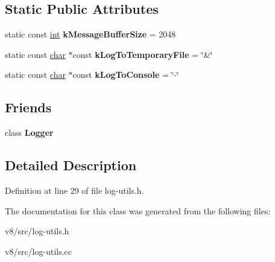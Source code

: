 \subsection*{Static Public Attributes}
\begin{DoxyCompactItemize}
\item 
\mbox{\label{classv8_1_1internal_1_1Log_a533184192668b0b2d4b7a241e8eb28ec}} 
static const \mbox{\hyperlink{classint}{int}} {\bfseries k\+Message\+Buffer\+Size} = 2048
\item 
\mbox{\label{classv8_1_1internal_1_1Log_a89565991012a486da0e90f15a749c3d3}} 
static const \mbox{\hyperlink{classchar}{char}} $\ast$const {\bfseries k\+Log\+To\+Temporary\+File} = \char`\"{}\&\char`\"{}
\item 
\mbox{\label{classv8_1_1internal_1_1Log_a92f1f316f4e0eb7ae4e05cb420f9af50}} 
static const \mbox{\hyperlink{classchar}{char}} $\ast$const {\bfseries k\+Log\+To\+Console} = \char`\"{}-\/\char`\"{}
\end{DoxyCompactItemize}
\subsection*{Friends}
\begin{DoxyCompactItemize}
\item 
\mbox{\label{classv8_1_1internal_1_1Log_aff02b76416d2846736b7ecd798921a0a}} 
class {\bfseries Logger}
\end{DoxyCompactItemize}


\subsection{Detailed Description}


Definition at line 29 of file log-\/utils.\+h.



The documentation for this class was generated from the following files\+:\begin{DoxyCompactItemize}
\item 
v8/src/log-\/utils.\+h\item 
v8/src/log-\/utils.\+cc\end{DoxyCompactItemize}

